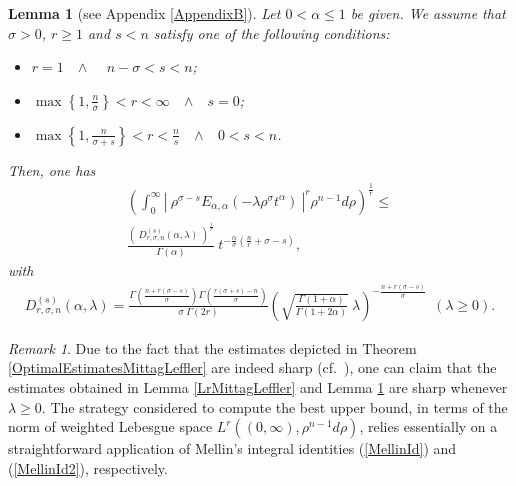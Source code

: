 \documentclass{amsart}
\newtheorem{lemma}[theorem]{Lemma}
\theoremstyle{definition}
\theoremstyle{remark}
\newtheorem{remark}[theorem]{Remark}
\numberwithin{equation}{section}
\begin{document}
\begin{lemma}[see Appendix \ref{AppendixB}]\label{LrMittagLeffler2}
	Let $0<\alpha\leq 1$ be given. We assume that $\sigma>0$, $r\geq 1$ and $\displaystyle s<n$ satisfy one of the following conditions:
	\begin{itemize}
		\item[{\bf (i)}] $r=1$~~$\wedge$~~ $n-\sigma<s<n$;
		\item[{\bf (ii)}] $\displaystyle \max\left\{1,\frac{n}{\sigma}\right\} <r<\infty$~~$\wedge$~~$s=0$;  
		\item[{\bf (iii)}] $\displaystyle \max\left\{1,\frac{n}{\sigma+s}\right\} <r<\frac{n}{s}$~~$\wedge$~~$0<s<n$. 
	\end{itemize}
	Then, one has
	\begin{eqnarray}
		\label{IneqD}		\left(\int_0^\infty\left|~\rho^{\sigma-s} E_{\alpha,\alpha}(-\lambda \rho^\sigma t^{\alpha})~\right|^r \rho^{n-1}d\rho\right)^{\frac{1}{r}}  \leq \nonumber \\ \frac{\left(~D_{r,\sigma,n}^{(s)}(\alpha,\lambda)~\right)^{\frac{1}{r}}}{\Gamma(\alpha)}~t^{-\frac{\alpha}{\sigma}\left(\frac{n}{r}+{\sigma-s}\right)}, 
	\end{eqnarray}
	with
	\begin{eqnarray*}
		D_{r,\sigma,n}^{(s)}(\alpha,\lambda)=\displaystyle \frac{\Gamma\left(\frac{n+r(\sigma-s)
			}{\sigma}\right)\Gamma\left(\frac{r(\sigma+s)-n}{\sigma}\right)}{\sigma~\Gamma(2r)}\left(\sqrt{\frac{\Gamma(1+\alpha)}{\Gamma(1+2\alpha)}}~\lambda\right)^{-\frac{n+r(\sigma-s)}{\sigma}} \displaystyle~~(\lambda\geq 0).
	\end{eqnarray*}
\end{lemma}





\begin{remark}
	Due to the fact that the estimates depicted in Theorem \ref{OptimalEstimatesMittagLeffler} are indeed sharp (cf.~\cite{Simon14,BS21}), one can claim that the estimates obtained in Lemma \ref{LrMittagLeffler} and Lemma \ref{LrMittagLeffler2} are sharp whenever $\lambda\geq 0$.
	The strategy considered to compute the best upper bound, in terms of the norm of weighted Lebesgue space $L^r((0,\infty),\rho^{n-1}d\rho)$, relies essentially on a straightforward application of Mellin's integral identities (\ref{MellinId}) and (\ref{MellinId2}), respectively.
\end{remark}
\end{document}
